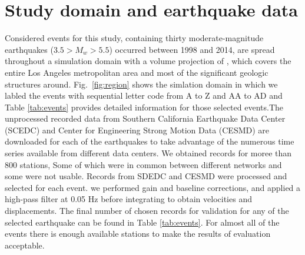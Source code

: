 
\section{Study domain and earthquake data}

Considered events for this study, containing thirty moderate-magnitude earthquakes ($3.5 > M_w > 5.5$) occurred between 1998 and 2014, are spread throughout a simulation domain with a volume projection of , which covers the entire Los Angeles metropolitan area and most of the significant geologic structures around. Fig.~\ref{fig:region} shows the simlation domain in which we labled the events with sequential letter code from A to Z and AA to AD and Table \ref{tab:events} provides detailed information for those selected events.The unprocessed recorded data from Southern California Earthquake Data Center (SCEDC) and Center for Engineering Strong Motion Data (CESMD) are downloaded for each of the earthquakes to take advantage of the numerous time series available from different data centers. We obtained records for moree than 800 stations, Some of which were in common between different networks and some were not usable. Records from SDEDC and CESMD were processed and selected for each event. we performed gain and baseline corrections, and applied a high-pass filter at 0.05 Hz before integrating to obtain velocities and displacements. The final number of chosen records for validation for any of the selected earthquake can be found in Table \ref{tab:events}. For almost all of the events there is enough available stations to make the results of evaluation acceptable. 



